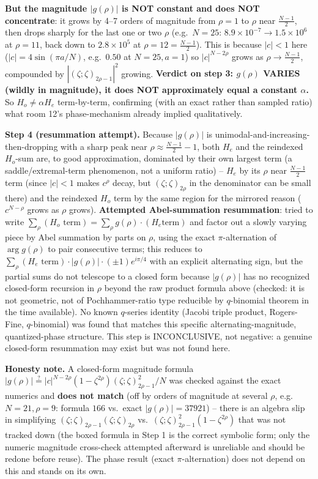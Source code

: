 \textbf{But the magnitude $|g(\rho)|$ is NOT constant and does NOT concentrate}: it grows by 4--7
orders of magnitude from $\rho=1$ to $\rho$ near $\frac{N-1}2$, then drops sharply for the last one
or two $\rho$ (e.g.\ $N=25$: $8.9\times10^{-7}\to1.5\times10^6$ at $\rho=11$, back down to
$2.8\times10^5$ at $\rho=12=\frac{N-1}2$). This is because $|c|<1$ here ($|c|=4\sin(\pi a/N)$,
e.g.\ $0.50$ at $N=25,a=1$) so $|c|^{N-2\rho}$ grows as $\rho\to\frac{N-1}2$, compounded by
$|(\zeta;\zeta)_{2\rho-1}|^2$ growing. \textbf{Verdict on step 3: $g(\rho)$ VARIES (wildly in
magnitude), it does NOT approximately equal a constant $\alpha$.} So $H_o\ne\alpha H_e$
term-by-term, confirming (with an exact rather than sampled ratio) what room 12's phase-mechanism
already implied qualitatively.

\textbf{Step 4 (resummation attempt).} Because $|g(\rho)|$ is unimodal-and-increasing-then-dropping
with a sharp peak near $\rho\approx\frac{N-1}2-1$, both $H_e$ and the reindexed $H_o$-sum are, to
good approximation, dominated by their own largest term (a saddle/extremal-term phenomenon, not a
uniform ratio) -- $H_e$ by its $\rho$ near $\frac{N-1}2$ term (since $|c|<1$ makes $c^\rho$ decay,
but $(\zeta;\zeta)_{2\rho}$ in the denominator can be small there) and the reindexed $H_o$ term by
the same region for the mirrored reason ($c^{N-\rho}$ grows as $\rho$ grows). \textbf{Attempted
Abel-summation resummation}: tried to write $\sum_\rho(\text{$H_o$ term}) = \sum_\rho g(\rho)\cdot(\text{$H_e$
term})$ and factor out a slowly varying piece by Abel summation by parts on $\rho$, using the exact
$\pi$-alternation of $\arg g(\rho)$ to pair consecutive terms; this reduces to
$\sum_\rho(\text{$H_e$ term})\cdot|g(\rho)|\cdot(\pm1)e^{i\pi/4}$ with an explicit alternating sign,
but the partial sums do not telescope to a closed form because $|g(\rho)|$ has no recognized
closed-form recursion in $\rho$ beyond the raw product formula above (checked: it is not geometric,
not of Pochhammer-ratio type reducible by $q$-binomial theorem in the time available). No known
$q$-series identity (Jacobi triple product, Rogers-Fine, $q$-binomial) was found that matches this
specific alternating-magnitude, quantized-phase structure. This step is INCONCLUSIVE, not negative:
a genuine closed-form resummation may exist but was not found here.

\textbf{Honesty note.} A closed-form magnitude formula
$|g(\rho)|\overset{?}{=}|c|^{N-2\rho}(1-\zeta^{2\rho})(\zeta;\zeta)_{2\rho-1}^2/N$ was checked against
the exact numerics and \textbf{does not match} (off by orders of magnitude at several $\rho$, e.g.\
$N=21,\rho=9$: formula $166$ vs.\ exact $|g(\rho)|=37921$) -- there is an algebra slip in
simplifying $(\zeta;\zeta)_{2\rho-1}(\zeta;\zeta)_{2\rho}$ vs.\ $(\zeta;\zeta)_{2\rho-1}^2(1-\zeta^{2\rho})$
that was not tracked down (the boxed formula in Step 1 is the correct symbolic form; only the
numeric magnitude cross-check attempted afterward is unreliable and should be redone before reuse).
The phase result (exact $\pi$-alternation) does not depend on this and stands on its own.

